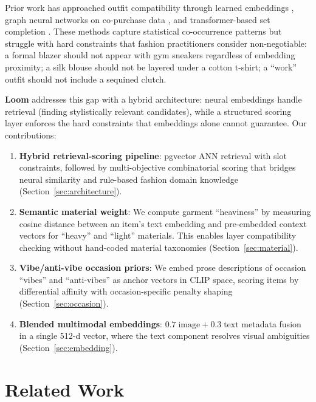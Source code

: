\documentclass[10pt,twocolumn]{article}
\begin{document}
Prior work has approached outfit compatibility through learned embeddings
\citep{vasileva2018learning, chia2022fashionclip}, graph neural networks on
co-purchase data \citep{cui2019dressing}, and transformer-based set
completion \citep{sarkar2023outfittransformer}.  These methods capture
statistical co-occurrence patterns but struggle with hard constraints that
fashion practitioners consider non-negotiable: a formal blazer should not
appear with gym sneakers regardless of embedding proximity; a silk blouse
should not be layered under a cotton t-shirt; a ``work'' outfit should not
include a sequined clutch.

\textbf{Loom} addresses this gap with a hybrid architecture: neural
embeddings handle retrieval (finding stylistically relevant candidates),
while a structured scoring layer enforces the hard constraints that
embeddings alone cannot guarantee.  Our contributions:

\begin{enumerate}[leftmargin=*,topsep=2pt,itemsep=1pt]
\item \textbf{Hybrid retrieval-scoring pipeline}: pgvector ANN retrieval
  with slot constraints, followed by multi-objective combinatorial scoring
  that bridges neural similarity and rule-based fashion domain knowledge
  (Section~\ref{sec:architecture}).

\item \textbf{Semantic material weight}: We compute garment ``heaviness''
  by measuring cosine distance between an item's text embedding and
  pre-embedded context vectors for ``heavy'' and ``light'' materials.  This
  enables layer compatibility checking without hand-coded material
  taxonomies (Section~\ref{sec:material}).

\item \textbf{Vibe/anti-vibe occasion priors}: We embed prose descriptions
  of occasion ``vibes'' and ``anti-vibes'' as anchor vectors in CLIP space,
  scoring items by differential affinity with occasion-specific penalty
  shaping (Section~\ref{sec:occasion}).

\item \textbf{Blended multimodal embeddings}: $0.7\;\text{image} +
  0.3\;\text{text}$ metadata fusion in a single 512-d vector, where the
  text component resolves visual ambiguities (Section~\ref{sec:embedding}).
\end{enumerate}

\section{Related Work}
\label{sec:related}
\end{document}
